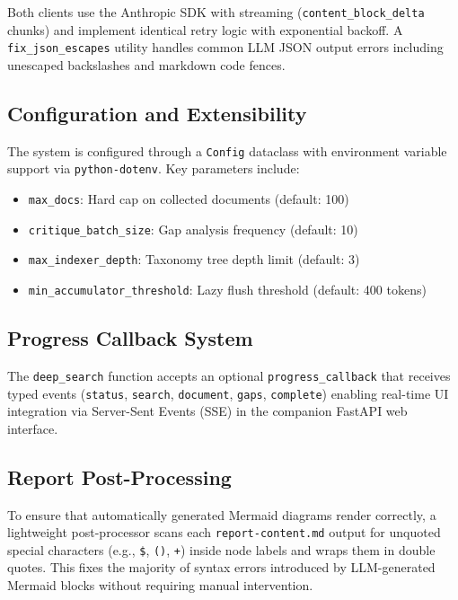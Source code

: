 \documentclass[conference]{IEEEtran}
\begin{document}
Both clients use the Anthropic SDK with streaming (\texttt{content\_block\_delta} chunks) and implement identical retry logic with exponential backoff. A \texttt{fix\_json\_escapes} utility handles common LLM JSON output errors including unescaped backslashes and markdown code fences.

\subsection{Configuration and Extensibility}

The system is configured through a \texttt{Config} dataclass with environment variable support via \texttt{python-dotenv}. Key parameters include:

\begin{itemize}
    \item \texttt{max\_docs}: Hard cap on collected documents (default: 100)
    \item \texttt{critique\_batch\_size}: Gap analysis frequency (default: 10)
    \item \texttt{max\_indexer\_depth}: Taxonomy tree depth limit (default: 3)
    \item \texttt{min\_accumulator\_threshold}: Lazy flush threshold (default: 400 tokens)
\end{itemize}

\subsection{Progress Callback System}

The \texttt{deep\_search} function accepts an optional \texttt{progress\_callback} that receives typed events (\texttt{status}, \texttt{search}, \texttt{document}, \texttt{gaps}, \texttt{complete}) enabling real-time UI integration via Server-Sent Events (SSE) in the companion FastAPI web interface.

\subsection{Report Post-Processing}

To ensure that automatically generated Mermaid diagrams render correctly, a lightweight post-processor scans each \texttt{report-content.md} output for unquoted special characters (e.g., \texttt{\$}, \texttt{()}, \texttt{+}) inside node labels and wraps them in double quotes. This fixes the majority of syntax errors introduced by LLM-generated Mermaid blocks without requiring manual intervention.
\end{document}
